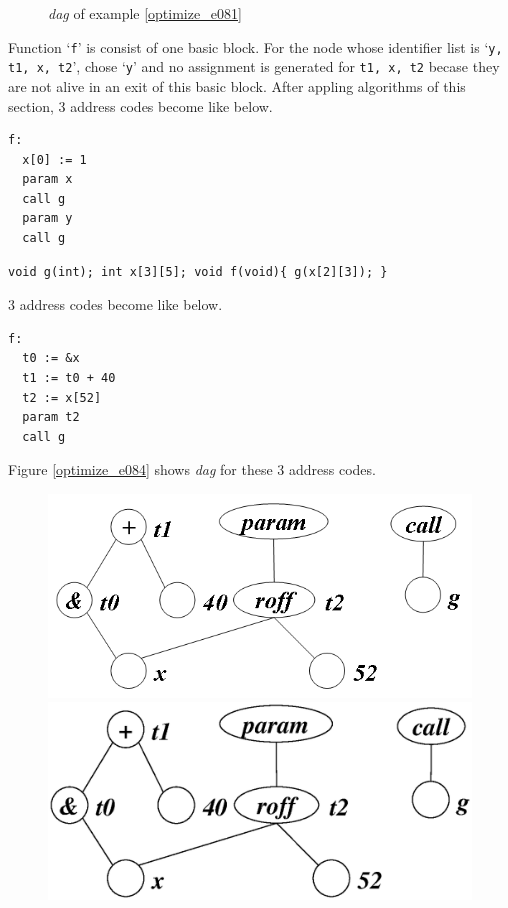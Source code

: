 \begin{Example}
\begin{figure}[htbp]
\begin{center}
\caption{{\em dag} of example \ref{optimize_e081}}
\label{optimize_e082}
\end{center}
\end{figure}
Function `{\tt{f}}' is consist of one basic block.
For the node whose identifier list is `{\tt{y, t1, x, t2}}',
chose `{\tt{y}}' and no assignment is generated for
{\tt{t1, x, t2}} becase they are not alive in an exit
of this basic block.
After appling algorithms of this section,
3 address codes become like below.
\begin{verbatim}
f:
  x[0] := 1
  param x
  call g
  param y
  call g
\end{verbatim}
\end{Example}

\begin{Example}
\label{optimize_e083}
\begin{verbatim}
void g(int); int x[3][5]; void f(void){ g(x[2][3]); }
\end{verbatim}
3 address codes become like below.
\begin{verbatim}
f:
  t0 := &x
  t1 := t0 + 40
  t2 := x[52]
  param t2
  call g
\end{verbatim}
Figure \ref{optimize_e084} shows {\em dag} for these 3 address codes.
\begin{figure}[htbp]
\begin{center}
\begin{htmlonly}
\includegraphics[width=1.0\linewidth,height=0.509\linewidth]{opt035.png}
\end{htmlonly}
\begin{latexonly}
\includegraphics[width=1.0\linewidth,height=0.509\linewidth]{opt035.eps}

\end{latexonly}
\end{center}
\end{figure}
\end{Example}
